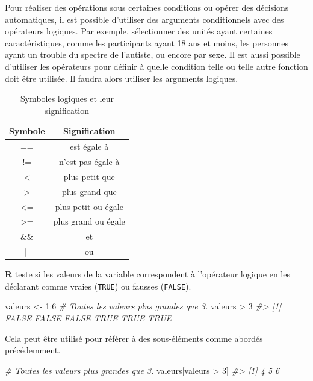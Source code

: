 \documentclass[
]{book}
\newenvironment{Shaded}{}{}
\newcommand{\CommentTok}[1]{\textit{#1}}
\newcommand{\DecValTok}[1]{#1}
\newcommand{\NormalTok}[1]{#1}
\newcommand{\OtherTok}[1]{#1}
\newcommand{\SpecialCharTok}[1]{#1}
\begin{document}
Pour réaliser des opérations sous certaines conditions ou opérer des décisions automatiques, il est possible d'utiliser des arguments conditionnels avec des opérateurs logiques. Par exemple, sélectionner des unités ayant certaines caractéristiques, comme les participants ayant 18 ans et moins, les personnes ayant un trouble du spectre de l'autiste, ou encore par sexe. Il est aussi possible d'utiliser les opérateurs pour définir à quelle condition telle ou telle autre fonction doit être utilisée. Il faudra alors utiliser les arguments logiques.

\begin{table}[H]

\caption{\label{tab:unnamed-chunk-25}Symboles logiques et leur signification}
\centering
\begin{tabular}[t]{cc}
\toprule
Symbole & Signification\\
\midrule
== & est égale à\\
!= & n'est pas égale à\\
< & plus petit que\\
> & plus grand que\\
<= & plus petit ou égale\\
\addlinespace
>= & plus grand ou égale\\
\&\& & et\\
|| & ou\\
\bottomrule
\end{tabular}
\end{table}

\textbf{R} teste si les valeurs de la variable correspondent à l'opérateur logique en les déclarant comme vraies (\texttt{TRUE}) ou fausses (\texttt{FALSE}).

\begin{Shaded}
\begin{Highlighting}[]
\NormalTok{valeurs }\OtherTok{\textless{}{-}} \DecValTok{1}\SpecialCharTok{:}\DecValTok{6}
\CommentTok{\# Toutes les valeurs plus grandes que 3.}
\NormalTok{valeurs }\SpecialCharTok{\textgreater{}} \DecValTok{3}
\CommentTok{\#\textgreater{} [1] FALSE FALSE FALSE  TRUE  TRUE  TRUE}
\end{Highlighting}
\end{Shaded}

Cela peut être utilisé pour référer à des sous-éléments comme abordés précédemment.

\begin{Shaded}
\begin{Highlighting}[]
\CommentTok{\# Toutes les valeurs plus grandes que 3.}
\NormalTok{valeurs[valeurs }\SpecialCharTok{\textgreater{}} \DecValTok{3}\NormalTok{]}
\CommentTok{\#\textgreater{} [1] 4 5 6}
\end{Highlighting}
\end{Shaded}
\end{document}
